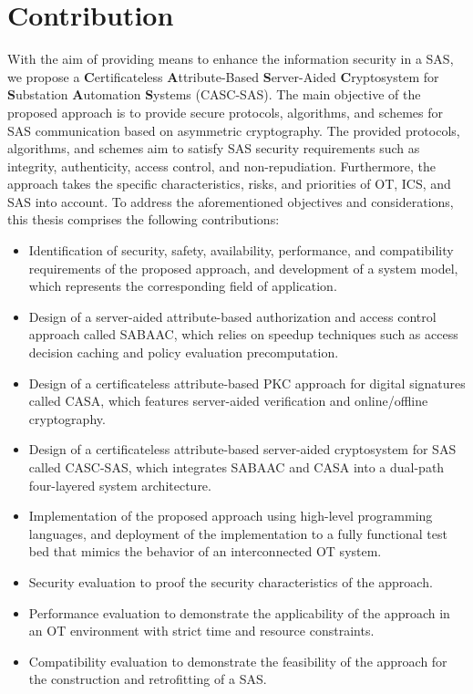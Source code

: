 \section{Contribution}
\label{sec:introduction:contribution}
With the aim of providing means to enhance the information security in a SAS, we propose a \textbf{C}ertificateless \textbf{A}ttribute-Based \textbf{S}erver-Aided \textbf{C}ryptosystem for \textbf{S}ubstation \textbf{A}utomation \textbf{S}ystems (CASC-SAS).
The main objective of the proposed approach is to provide secure protocols, algorithms, and schemes for SAS communication based on asymmetric cryptography.
The provided protocols, algorithms, and schemes aim to satisfy SAS security requirements such as integrity, authenticity, access control, and non-repudiation.
Furthermore, the approach takes the specific characteristics, risks, and priorities of OT, ICS, and SAS into account.
To address the aforementioned objectives and considerations, this thesis comprises the following contributions:
\begin{itemize}
    \item Identification of security, safety, availability, performance, and compatibility requirements of the proposed approach, and development of a system model, which represents the corresponding field of application.
    \item Design of a server-aided attribute-based authorization and access control approach called SABAAC, which relies on speedup techniques such as access decision caching and policy evaluation precomputation.
    \item Design of a certificateless attribute-based PKC approach for digital signatures called CASA, which features server-aided verification and online/offline cryptography.
    \item Design of a certificateless attribute-based server-aided cryptosystem for SAS called CASC-SAS, which integrates SABAAC and CASA into a dual-path four-layered system architecture.
    \item Implementation of the proposed approach using high-level programming languages, and deployment of the implementation to a fully functional test bed that mimics the behavior of an interconnected OT system.
    \item Security evaluation to proof the security characteristics of the approach.
    \item Performance evaluation to demonstrate the applicability of the approach in an OT environment with strict time and resource constraints.
    \item Compatibility evaluation to demonstrate the feasibility of the approach for the construction and retrofitting of a SAS.
\end{itemize}

